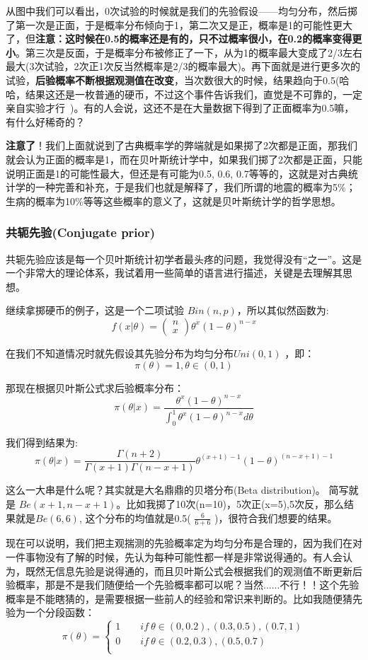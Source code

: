 \documentclass[12pt]{article}
\begin{document}
从图中我们可以看出，0次试验的时候就是我们的先验假设——均匀分布，然后掷了第一次是正面，于是概率分布倾向于1，第二次又是正，概率是1的可能性更大了，但\textbf{注意：这时候在0.5的概率还是有的，只不过概率很小，在0.2的概率变得更小}。第三次是反面，于是概率分布被修正了一下，从为1的概率最大变成了2/3左右最大(3次试验，2次正1次反当然概率是2/3的概率最大)。再下面就是进行更多次的试验，\textbf{后验概率不断根据观测值在改变}，当次数很大的时候，结果趋向于0.5(哈哈，结果这还是一枚普通的硬币，不过这个事件告诉我们，直觉是不可靠的，一定亲自实验才行~)。有的人会说，这还不是在大量数据下得到了正面概率为0.5嘛，有什么好稀奇的？

\textbf{注意了}！我们上面就说到了古典概率学的弊端就是如果掷了2次都是正面，那我们就会认为正面的概率是1，而在贝叶斯统计学中，如果我们掷了2次都是正面，只能说明正面是1的可能性最大，但还是有可能为0.5, 0.6, 0.7等等的，这就是对古典统计学的一种完善和补充，于是我们也就是解释了，我们所谓的地震的概率为5\%；生病的概率为10\%等等这些概率的意义了，这就是贝叶斯统计学的哲学思想。

\subsubsection{共轭先验(Conjugate prior)}
共轭先验应该是每一个贝叶斯统计初学者最头疼的问题，我觉得没有“之一”。这是一个非常大的理论体系，我试着用一些简单的语言进行描述，关键是去理解其思想。

继续拿掷硬币的例子，这是一个二项试验 $Bin(n,p)$，所以其似然函数为:
$$
f(x|\theta) = \begin{pmatrix}n\\x\end{pmatrix}\theta^x(1-\theta)^{n-x}
$$

在我们不知道情况时就先假设其先验分布为均匀分布$Uni(0,1)$ ，即：
$$
\pi(\theta) = 1, \theta \in (0, 1)
$$

那现在根据贝叶斯公式求后验概率分布：
$$
\pi(\theta|x) = \frac{\theta^x(1-\theta)^{n-x}}{\int_0^1\theta^x(1-\theta)^{n-x}d\theta}
$$

我们得到结果为:
$$
\pi(\theta|x) = \frac{\Gamma(n+2)}{\Gamma(x+1)\Gamma(n-x+1)}\theta^{(x+1)-1}(1-\theta)^{(n-x+1)-1}
$$

这么一大串是什么呢？其实就是大名鼎鼎的贝塔分布(Beta distribution)。 简写就是 $Be(x+1, n-x+1)$。比如我掷了10次(n=10)，5次正(x=5),5次反，那么结果就是$Be(6,6)$, 这个分布的均值就是0.5( $\frac{6}{6+6}$ )，很符合我们想要的结果。

现在可以说明，我们把主观揣测的先验概率定为均匀分布是合理的，因为我们在对一件事物没有了解的时候，先认为每种可能性都一样是非常说得通的。有人会认为，既然无信息先验是说得通的，而且贝叶斯公式会根据我们的观测值不断更新后验概率，那是不是我们随便给一个先验概率都可以呢？当然......不行！！这个先验概率是不能瞎猜的，是需要根据一些前人的经验和常识来判断的。比如我随便猜先验为一个分段函数：
$$
\pi(\theta) = \begin{cases}
1 \qquad if \ \theta \in (0, 0.2), (0.3, 0.5), (0.7, 1) \\
0 \qquad if \ \theta \in (0.2, 0.3), (0.5, 0.7) \\
\end{cases}
$$
\end{document}
